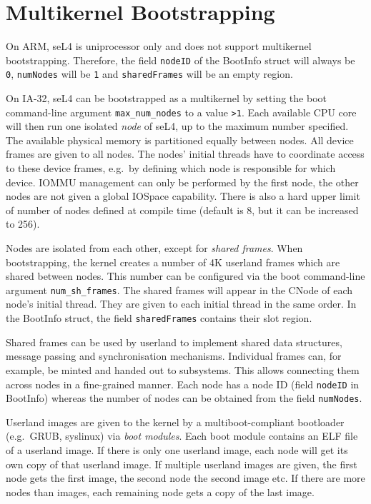 \section{\label{ch:bootup:multikernel}Multikernel Bootstrapping}

On ARM, seL4 is uniprocessor only and does not support multikernel
\cite{Baumann_BDHIPRSS_09} bootstrapping. Therefore, the field \texttt{nodeID}
of the BootInfo struct
will always be \texttt{0}, \texttt{numNodes} will be \texttt{1} and
\texttt{sharedFrames} will be an empty region.

\ifxeightsix
On IA-32, seL4 can be bootstrapped as a multikernel
by setting the boot command-line argument \texttt{max\_num\_nodes} to a value
\texttt{>1}.
Each available CPU core will then run one isolated \emph{node} of seL4, up to
the maximum number specified.
The available physical memory is partitioned equally between nodes.
All device frames are given to all nodes. The nodes' initial threads have to
coordinate access to these device frames, e.g.\ by defining which node is
responsible for which device.
IOMMU management can only be performed by the first node, the other nodes
are not given a global IOSpace capability. 
There is also a hard upper limit of number of nodes defined at compile time
(default is 8, but it can be increased to 256).

Nodes are isolated from each other, except for
\emph{shared frames}. When bootstrapping, the kernel creates a number of 4K
userland frames which are shared between nodes. This number can be configured
via the boot command-line argument \texttt{num\_sh\_frames}. The shared frames
will appear in the CNode of each node's initial thread. They are given to
each initial thread in the same order. In the BootInfo struct, the field
\texttt{sharedFrames} contains their slot region.

Shared frames can be used by userland to implement
shared data structures,
message passing and synchronisation mechanisms. Individual frames can, for
example, be minted and handed out to subsystems. This allows connecting them
across nodes in a fine-grained manner. Each node has a node ID (field
\texttt{nodeID} in BootInfo) whereas the number of nodes can be obtained from
the field \texttt{numNodes}.

Userland images are given to the kernel by a multiboot-compliant bootloader
(e.g.\ GRUB, syslinux) via \emph{boot modules}. Each boot module contains an
ELF file of a userland image. If there is only one userland image,
each node will get its own copy of that userland image. If
multiple userland images are given, the first node gets the first image, the
second node the second image etc. If there are more nodes than images, each
remaining node gets a copy of the last image.

